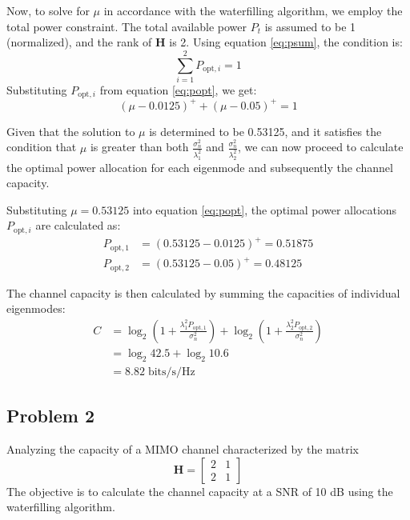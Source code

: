 \documentclass[lettersize,journal]{IEEEtran}
\begin{document}
Now, to solve for \( \mu \) in accordance with the waterfilling algorithm, we employ the total power constraint. The total available power \( P_t \) is assumed to be 1 (normalized), and the rank of \( \mathbf{H} \) is 2. Using equation \eqref{eq:psum}, the condition is:
\begin{equation}
\sum_{i=1}^{2} P_{\text{opt},i} = 1
\end{equation}
Substituting \( P_{\text{opt},i} \) from equation \eqref{eq:popt}, we get:
\begin{equation}
\left( \mu - 0.0125 \right)^+ + \left( \mu - 0.05 \right)^+ = 1
\end{equation}

Given that the solution to \( \mu \) is determined to be 0.53125, and it satisfies the condition that \( \mu \) is greater than both \( \frac{\sigma_n^2}{\lambda_1^2} \) and \( \frac{\sigma_n^2}{\lambda_2^2} \), we can now proceed to calculate the optimal power allocation for each eigenmode and subsequently the channel capacity.

Substituting \( \mu = 0.53125 \) into equation \eqref{eq:popt}, the optimal power allocations \( P_{\text{opt},i} \) are calculated as:
\begin{equation}
\begin{aligned}
P_{\text{opt},1} &= \left( 0.53125 - 0.0125 \right)^+ = 0.51875 \\
P_{\text{opt},2} &= \left( 0.53125 - 0.05 \right)^+ = 0.48125
\end{aligned}
\end{equation}

The channel capacity is then calculated by summing the capacities of individual eigenmodes:
\begin{equation}
\begin{aligned}
C &= \log_2\left(1 + \frac{\lambda_1^2 P_{\text{opt},1}}{\sigma_n^2}\right) + \log_2\left(1 + \frac{\lambda_2^2 P_{\text{opt},2}}{\sigma_n^2}\right)\\
&= \log_2 42.5 + \log_2 10.6\\
&= 8.82 \; \text{bits/s/Hz}
\end{aligned}
\end{equation}

\subsection{Problem 2}
Analyzing the capacity of a MIMO channel characterized by the matrix
\begin{equation}
\mathbf{H} = \begin{bmatrix}
2 & 1 \\
2 & 1 \end{bmatrix}
\end{equation}
The objective is to calculate the channel capacity at a SNR of 10 dB using the waterfilling algorithm.
\end{document}
